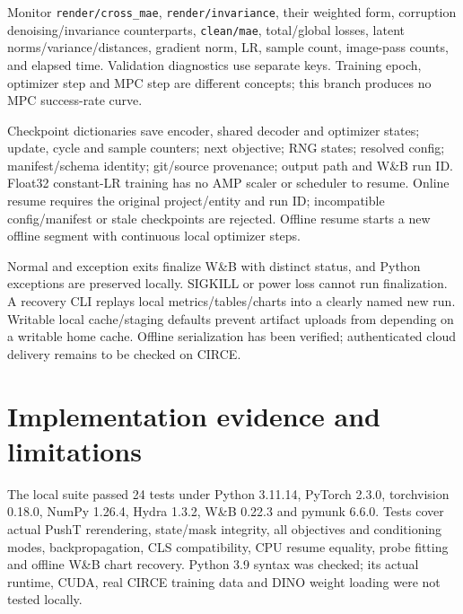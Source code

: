 \documentclass[11pt,a4paper]{article}
\newcommand{\code}[1]{\nolinkurl{#1}}
\begin{document}
Monitor \code{render/cross_mae}, \code{render/invariance}, their weighted form,
corruption denoising/invariance counterparts, \code{clean/mae}, total/global losses,
latent norms/variance/distances, gradient norm, LR, sample count, image-pass counts,
and elapsed time. Validation diagnostics use separate keys. Training epoch, optimizer
step and MPC step are different concepts; this branch produces no MPC success-rate curve.

Checkpoint dictionaries save encoder, shared decoder and optimizer states; update,
cycle and sample counters; next objective; RNG states; resolved config; manifest/schema
identity; git/source provenance; output path and W\&B run ID. Float32 constant-LR
training has no AMP scaler or scheduler to resume. Online resume requires the original
project/entity and run ID; incompatible config/manifest or stale checkpoints are rejected.
Offline resume starts a new offline segment with continuous local optimizer steps.

Normal and exception exits finalize W\&B with distinct status, and Python exceptions
are preserved locally. SIGKILL or power loss cannot run finalization. A recovery CLI
replays local metrics/tables/charts into a clearly named new run. Writable local
cache/staging defaults prevent artifact uploads from depending on a writable home
cache. Offline serialization has been verified; authenticated cloud delivery remains
to be checked on CIRCE.

\section{Implementation evidence and limitations}
The local suite passed 24 tests under Python 3.11.14, PyTorch 2.3.0, torchvision
0.18.0, NumPy 1.26.4, Hydra 1.3.2, W\&B 0.22.3 and pymunk 6.6.0. Tests cover actual
PushT rerendering, state/mask integrity, all objectives and conditioning modes,
backpropagation, CLS compatibility, CPU resume equality, probe fitting and offline
W\&B chart recovery. Python 3.9 syntax was checked; its actual runtime, CUDA, real
CIRCE training data and DINO weight loading were not tested locally.
\end{document}

